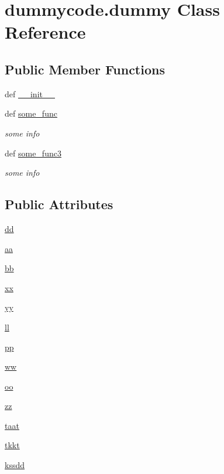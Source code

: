 \section{dummycode.\-dummy Class Reference}
\label{classdummycode_1_1dummy}
\subsection*{Public Member Functions}
\begin{DoxyCompactItemize}
\item 
def \hyperlink{classdummycode_1_1dummy_a674a0e2c1a4f640d13fb13be91869cec}{\-\_\-\-\_\-init\-\_\-\-\_\-}
\item 
def \hyperlink{classdummycode_1_1dummy_a7646a5afb54e46a4ea577bafcb73a4e7}{some\-\_\-func}
\begin{DoxyCompactList}\small\item\em some info \end{DoxyCompactList}\item 
def \hyperlink{classdummycode_1_1dummy_a0ba4f337dcebcb471c9e7947aace7e4e}{some\-\_\-func3}
\begin{DoxyCompactList}\small\item\em some info \end{DoxyCompactList}\end{DoxyCompactItemize}
\subsection*{Public Attributes}
\begin{DoxyCompactItemize}
\item 
\hyperlink{classdummycode_1_1dummy_af2feb69e325549343d505d0f5afaacd0}{dd}
\item 
\hyperlink{classdummycode_1_1dummy_ade8c2a23728fea407400de565af9d924}{aa}
\item 
\hyperlink{classdummycode_1_1dummy_a8fc4a473d7dc65b38abc8ca2bbf56d0c}{bb}
\item 
\hyperlink{classdummycode_1_1dummy_af1ae41fb24a1c0a52ae60bd1f2db9f5f}{xx}
\item 
\hyperlink{classdummycode_1_1dummy_ad0f056c4695b2525f883dbe1004fa7ba}{yy}
\item 
\hyperlink{classdummycode_1_1dummy_aff4159330a4c573597b401b5503818d7}{ll}
\item 
\hyperlink{classdummycode_1_1dummy_a4ded8e4fa38d817b96c7b21a869a16ae}{pp}
\item 
\hyperlink{classdummycode_1_1dummy_a65b1604eb43ffa41eb49a02655397fb7}{ww}
\item 
\hyperlink{classdummycode_1_1dummy_a49635a45286e102fb960d0bc4f4c3621}{oo}
\item 
\hyperlink{classdummycode_1_1dummy_af5c829ccdb5a89e8ba0f2cf476cb2aa0}{zz}
\item 
\hyperlink{classdummycode_1_1dummy_a638ed861d153ec60095bed0527eb89fc}{taat}
\item 
\hyperlink{classdummycode_1_1dummy_ac97503870ca57fa0d663fcc8177e9f75}{tkkt}
\item 
\hyperlink{classdummycode_1_1dummy_ada8cd7476ddcf39248ec97cb1c7367e9}{kssdd}
\end{DoxyCompactItemize}


